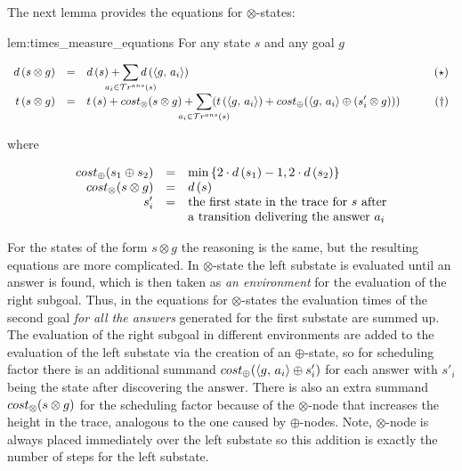 The next lemma provides the equations for $\otimes$-states:

\begin{replemma}{lem:times_measure_equations}
For any state $s$ and any goal $g$

\[
\begin{array}{rclr}
d\,(s \otimes g)  &=&  d\,(s) + \smashoperator[lr]{\sum\limits_{a_i \in \tra{s}}} d\,(\taskst{g}{a_i})& \qquad(\star) \\

 t\,(s \otimes g)  &=&  t\,(s) + \costconj{s}{g} + \smashoperator[lr]{\sum\limits_{a_i \in \tra{s}}} (t\,(\taskst{g}{a_i}) + \costdisj{\taskst{g}{a_i}}{(s'_i \otimes g)})&\qquad(\dagger)
\end{array}
\]

where 

\[
\begin{array}{rcl}
cost_{\oplus}(s_1 \oplus s_2) & = & \min\,\{2\cdot d\,(s_1) - 1, 2\cdot d\,(s_2)\} \\
cost_{\otimes}(s \otimes g) & = & d\,(s) \\
s'_i & = & \mbox{the first state in the trace for $s$ after} \\
 & & \mbox{a transition delivering the answer $a_i$} \\
\end{array}
\]
\end{replemma}

For the states of the form $s \otimes g$ the reasoning is the same, but the resulting equations are more complicated.
In $\otimes$-state the left substate is evaluated until an answer is found, which is then taken as
\emph{an environment} for the evaluation of the right subgoal.
Thus, in the equations for $\otimes$-states the evaluation times of the second goal \emph{for all
the answers} generated for the first substate are summed up. The evaluation of the right subgoal
in different environments are added to the evaluation of the left substate via the creation of
an $\oplus$-state, so for scheduling factor there is
an additional summand $cost_{\oplus}(\langle g ,\, a_i \rangle \oplus s'_i)$ for each answer with $s'_i$ being the state
after discovering the answer.
There is also an extra summand $cost_{\otimes}(s \otimes g)$ for the scheduling factor because of the
$\otimes$-node that increases the height in the trace, analogous to the one caused by
$\oplus$-nodes.
Note, $\otimes$-node is always placed immediately over the left substate so this
addition is exactly the number of steps for the left substate.

